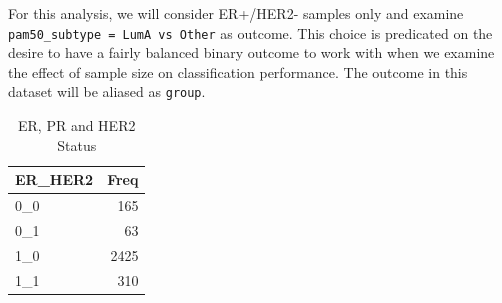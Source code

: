 \documentclass[
]{book}
\newenvironment{Shaded}{\begin{snugshade}}{\end{snugshade}}
\newcommand{\DataTypeTok}[1]{\textcolor[rgb]{0.13,0.29,0.53}{#1}}
\newcommand{\KeywordTok}[1]{\textcolor[rgb]{0.13,0.29,0.53}{\textbf{#1}}}
\newcommand{\NormalTok}[1]{#1}
\newcommand{\OperatorTok}[1]{\textcolor[rgb]{0.81,0.36,0.00}{\textbf{#1}}}
\newcommand{\OtherTok}[1]{\textcolor[rgb]{0.56,0.35,0.01}{#1}}
\newcommand{\StringTok}[1]{\textcolor[rgb]{0.31,0.60,0.02}{#1}}
\begin{document}
For this analysis, we will consider ER+/HER2- samples only and
examine \texttt{pam50\_subtype\ =\ \textquotesingle{}LumA\textquotesingle{}\ vs\ \textquotesingle{}Other\textquotesingle{}} as outcome.
This choice is predicated on the desire to have a fairly
balanced binary outcome to work with when we examine the effect
of sample size on classification performance.
The outcome in this dataset will be aliased as \texttt{group}.

\begin{Shaded}
\end{Shaded}

\begin{table}

\caption{\label{tab:brcaRna-preproc-subsetSamples}ER, PR and HER2 Status}
\centering
\begin{tabular}[t]{l|r}
\hline
ER\_HER2 & Freq\\
\hline
0\_0 & 165\\
\hline
0\_1 & 63\\
\hline
1\_0 & 2425\\
\hline
1\_1 & 310\\
\hline
\end{tabular}
\end{table}
\end{document}

